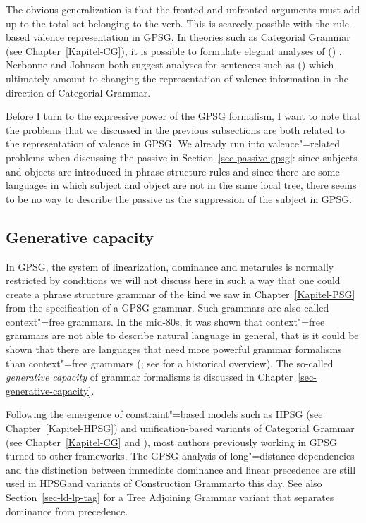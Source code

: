 \zl
The obvious generalization is that the fronted and unfronted arguments must add up to the total
set belonging to the verb. This is scarcely possible with the rule-based valence
representation in GPSG. In theories such as Categorial Grammar (see
Chapter~\ref{Kapitel-CG}), it is possible to formulate elegant analyses of ()
\citep{Geach70a}. Nerbonne and Johnson both suggest analyses for sentences such as () which
ultimately amount to changing the representation of valence information in the direction of
Categorial Grammar. 

Before I turn to the expressive power of the GPSG formalism, I want to note that the problems that
we discussed in the previous subsections are both related to the representation of valence in GPSG. We
already run into valence"=related problems when discussing the passive in Section~\ref{sec-passive-gpsg}: since subjects and objects are introduced in
phrase structure rules and since there are some languages in which subject and object are not in the
same local tree, there seems to be no way to describe the passive as the suppression of the subject
in GPSG.

\subsection{Generative capacity}

In GPSG, the system of linearization, dominance and metarules is normally restricted by conditions
we will not discuss here in such a way that one could create a phrase structure grammar of the kind
we saw in Chapter~\ref{Kapitel-PSG} from the specification of a GPSG grammar. Such grammars are also called
context"=free grammars. In the mid-80s, it was
shown that context"=free grammars are not able to describe natural language in general, that is it
could be shown that there are languages that need more powerful grammar formalisms than
context"=free grammars (\citealp{Shieber85a,Culy85a}; see  for a historical
overview). The so-called \emph{generative capacity} of grammar formalisms is discussed in
Chapter~\ref{sec-generative-capacity}.

\largerpage
Following the emergence of constraint"=based models such as HPSG (see Chapter~\ref{Kapitel-HPSG}) and
unification-based variants of Categorial Grammar (see Chapter~\ref{Kapitel-CG} and
\citealp{Uszkoreit86d}), most authors previously working in GPSG turned to other frameworks. The GPSG
analysis of long"=distance dependencies and the distinction between immediate dominance and linear precedence are
still used in HPSG\indexhpsg and variants of Construction Grammar\indexcxg to this day. See also
Section~\ref{sec-ld-lp-tag} for a Tree Adjoining Grammar variant that separates dominance from precedence.

